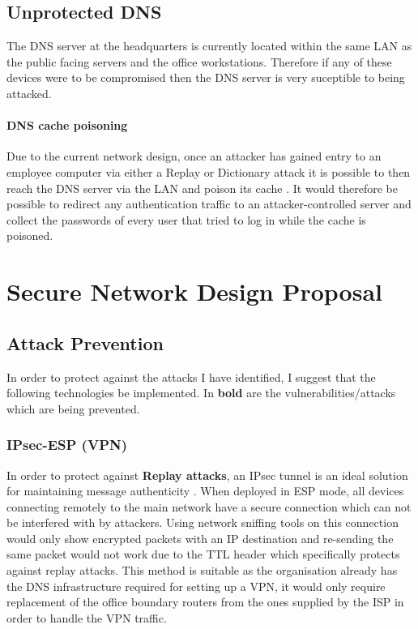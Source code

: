 \documentclass[11pt]{article}
\begin{document}
    \subsection{Unprotected DNS}
      The DNS server at the headquarters is currently located within the same LAN as the public facing servers and the office workstations. Therefore if any of these devices were to be compromised then the DNS server is very suceptible to being attacked.

      \paragraph{DNS cache poisoning}
        Due to the current network design, once an attacker has gained entry to an employee computer via either a Replay or Dictionary attack it is possible to then reach the DNS server via the LAN and poison its cache \citep{son2010hitchhiker}. It would therefore be possible to redirect any authentication traffic to an attacker-controlled server and collect the passwords of every user that tried to log in while the cache is poisoned.

    \section{Secure Network Design Proposal}
      \subsection{Attack Prevention}
        In order to protect against the attacks I have identified, I suggest that the following technologies be implemented. In \textbf{bold} are the vulnerabilities/attacks which are being prevented.

        \subsubsection{IPsec-ESP (VPN)} \label{ipsec}
          In order to protect against \textbf{Replay attacks}, an IPsec tunnel is an ideal solution for maintaining message authenticity \citep{ncsc2016IPSec}. When deployed in ESP mode, all devices connecting remotely to the main network have a secure connection which can not be interfered with by attackers. Using network sniffing tools on this connection would only show encrypted packets with an IP destination and re-sending the same packet would not work due to the TTL header which specifically protects against replay attacks. This method is suitable as the organisation already has the DNS infrastructure required for setting up a VPN, it would only require replacement of the office boundary routers from the ones supplied by the ISP in order to handle the VPN traffic.
\end{document}
